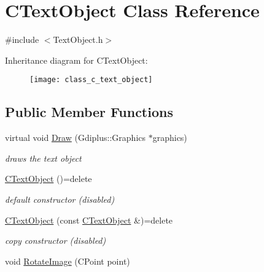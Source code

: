 \hypertarget{class_c_text_object}{}\section{C\+Text\+Object Class Reference}
\label{class_c_text_object}


{\ttfamily \#include $<$Text\+Object.\+h$>$}

Inheritance diagram for C\+Text\+Object\+:\begin{figure}[H]
\begin{center}
\leavevmode
\texttt{[image: class\_c\_text\_object]}
\end{center}
\end{figure}
\subsection*{Public Member Functions}
\begin{DoxyCompactItemize}
\item 
\mbox{\label{class_c_text_object_a467038e52d2e587083526cc42a76131f}} 
virtual void \mbox{\hyperlink{class_c_text_object_a467038e52d2e587083526cc42a76131f}{Draw}} (Gdiplus\+::\+Graphics $\ast$graphics)
\begin{DoxyCompactList}\small\item\em draws the text object \end{DoxyCompactList}\item 
\mbox{\label{class_c_text_object_a66962cb3d0c16793618834d8a3a66e43}} 
\mbox{\hyperlink{class_c_text_object_a66962cb3d0c16793618834d8a3a66e43}{C\+Text\+Object}} ()=delete
\begin{DoxyCompactList}\small\item\em default constructor (disabled) \end{DoxyCompactList}\item 
\mbox{\label{class_c_text_object_a0bf0c37b8c79abb854243d4359ba12e1}} 
\mbox{\hyperlink{class_c_text_object_a0bf0c37b8c79abb854243d4359ba12e1}{C\+Text\+Object}} (const \mbox{\hyperlink{class_c_text_object}{C\+Text\+Object}} \&)=delete
\begin{DoxyCompactList}\small\item\em copy constructor (disabled) \end{DoxyCompactList}\item 
void \mbox{\hyperlink{class_c_text_object_aa72faa5c71d011c108146d678faafb63}{Rotate\+Image}} (C\+Point point)
\end{DoxyCompactItemize}
